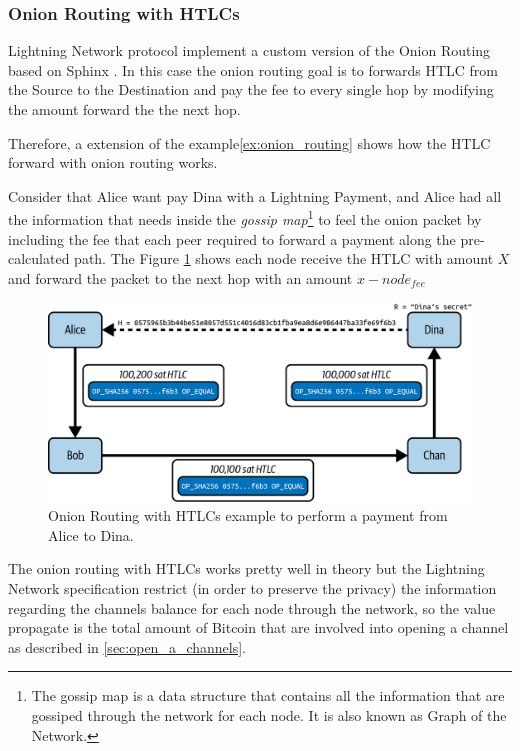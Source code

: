 \subsubsection{Onion Routing with HTLCs}

Lightning Network protocol implement a custom version of the Onion Routing based on Sphinx \cite{cryptoeprint:2008/475}. In this case the onion routing
goal is to forwards HTLC from the Source to the Destination and pay the fee to
every single hop by modifying the amount forward the the next hop.

Therefore, a extension of the example\ref{ex:onion_routing} shows how
the HTLC forward with onion routing works.

\begin{example}
  \label{ex:htl_onion_routing}
  Consider that Alice want pay Dina with a Lightning Payment, and Alice had all the
  information that needs inside the \emph{gossip map}\footnote{The gossip map is a data structure that contains all the information that are gossiped through the network for each node. It is also known as Graph of the Network.} to feel the
  onion packet by including the fee that each peer required to forward a payment
  along the pre-calculated path. The Figure \ref{fig:routing_path_htlc} shows each node receive the HTLC with
  amount $X$ and forward the packet to the next hop with an amount $x - node_{fee}$

  \begin{figure}[H]
    \begin{center}
      \includegraphics[width=0.6\columnwidth]{imgs/mtln_1008.png}
    \end{center}
    \caption{Onion Routing with HTLCs example to perform a payment from Alice to Dina.}
    \label{fig:routing_path_htlc}
  \end{figure}
\end{example}

The onion routing with HTLCs works pretty well in theory but the Lightning Network
specification restrict (in order to preserve the privacy) the information regarding
the channels balance for each node through the network, so the value
propagate is the total amount of Bitcoin that are involved into opening a channel as described in \ref{sec:open_a_channels}.

